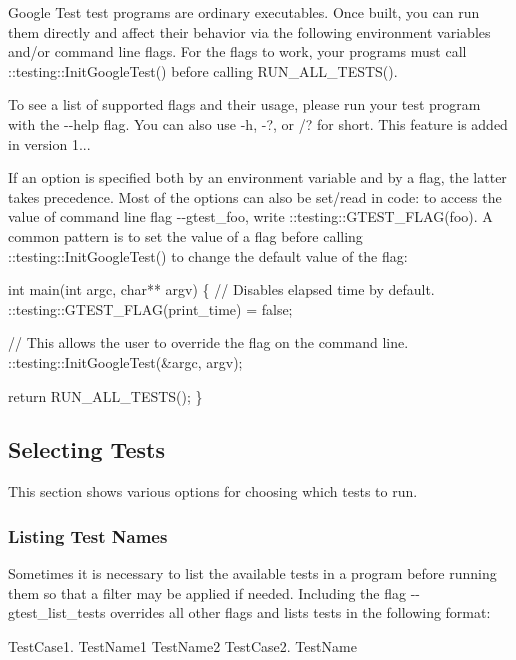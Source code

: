Google Test test programs are ordinary executables. Once built, you can run them directly and affect their behavior via the following environment variables and/or command line flags. For the flags to work, your programs must call {\ttfamily \+::testing\+::\+Init\+Google\+Test()} before calling {\ttfamily R\+U\+N\+\_\+\+A\+L\+L\+\_\+\+T\+E\+S\+T\+S()}.

To see a list of supported flags and their usage, please run your test program with the {\ttfamily -\/-\/help} flag. You can also use {\ttfamily -\/h}, {\ttfamily -\/?}, or {\ttfamily /?} for short. This feature is added in version 1...

If an option is specified both by an environment variable and by a flag, the latter takes precedence. Most of the options can also be set/read in code\+: to access the value of command line flag {\ttfamily -\/-\/gtest\+\_\+foo}, write {\ttfamily \+::testing\+::\+G\+T\+E\+S\+T\+\_\+\+F\+L\+A\+G(foo)}. A common pattern is to set the value of a flag before calling {\ttfamily \+::testing\+::\+Init\+Google\+Test()} to change the default value of the flag\+: 
\begin{DoxyCode}
int main(int argc, char** argv) \{
  // Disables elapsed time by default.
  ::testing::GTEST\_FLAG(print\_time) = false;

  // This allows the user to override the flag on the command line.
  ::testing::InitGoogleTest(&argc, argv);

  return RUN\_ALL\_TESTS();
\}
\end{DoxyCode}


\subsection*{Selecting Tests}

This section shows various options for choosing which tests to run.

\subsubsection*{Listing Test Names}

Sometimes it is necessary to list the available tests in a program before running them so that a filter may be applied if needed. Including the flag {\ttfamily -\/-\/gtest\+\_\+list\+\_\+tests} overrides all other flags and lists tests in the following format\+: 
\begin{DoxyCode}
TestCase1.
  TestName1
  TestName2
TestCase2.
  TestName
\end{DoxyCode}


